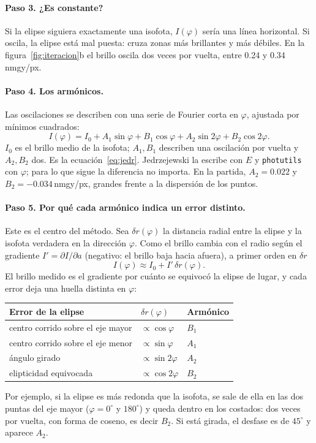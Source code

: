 \documentclass[11pt,a4paper]{article}
\newcommand{\code}[1]{\texttt{#1}}
\begin{document}
\paragraph{Paso 3. ¿Es constante?} Si la elipse siguiera exactamente una isofota, $I(\varphi)$ sería una línea
horizontal. Si oscila, la elipse está mal puesta: cruza zonas más brillantes y más débiles. En la
figura~\ref{fig:iteracion}b el brillo oscila dos veces por vuelta, entre 0.24 y 0.34\,nmgy/px.

\paragraph{Paso 4. Los armónicos.} Las oscilaciones se describen con una serie de Fourier corta en $\varphi$,
ajustada por mínimos cuadrados:
\begin{equation}\label{eq:armonicos}
I(\varphi) = I_0 + A_1\sin\varphi + B_1\cos\varphi + A_2\sin 2\varphi + B_2\cos 2\varphi .
\end{equation}
$I_0$ es el brillo medio de la isofota; $A_1, B_1$ describen una oscilación por vuelta y $A_2, B_2$ dos. Es la
ecuación~\eqref{eq:jedr}. Jedrzejewski la escribe con $E$ y \code{photutils} con $\varphi$; para lo que sigue
la diferencia no importa. En la partida,
$A_2 = 0.022$ y $B_2 = -0.034$\,nmgy/px, grandes frente a la dispersión de los puntos.

\paragraph{Paso 5. Por qué cada armónico indica un error distinto.} Este es el centro del método. Sea
$\delta r(\varphi)$ la distancia radial entre la elipse y la isofota verdadera en la dirección $\varphi$. Como el
brillo cambia con el radio según el gradiente $I' = \partial I/\partial a$ (negativo: el brillo baja hacia
afuera), a primer orden en $\delta r$
\begin{equation}\label{eq:taylor}
I(\varphi) \approx I_0 + I'\,\delta r(\varphi) .
\end{equation}
El brillo medido es el gradiente por cuánto se equivocó la elipse de lugar, y cada error deja una huella
distinta en $\varphi$:
\begin{center}
\begin{tabular}{lll}
\toprule
Error de la elipse & $\delta r(\varphi)$ & Armónico \\
\midrule
centro corrido sobre el eje mayor & $\propto\cos\varphi$ & $B_1$ \\
centro corrido sobre el eje menor & $\propto\sin\varphi$ & $A_1$ \\
ángulo girado & $\propto\sin 2\varphi$ & $A_2$ \\
elipticidad equivocada & $\propto\cos 2\varphi$ & $B_2$ \\
\bottomrule
\end{tabular}
\end{center}
Por ejemplo, si la elipse es más redonda que la isofota, se sale de ella en las dos puntas del eje mayor
($\varphi = 0^\circ$ y $180^\circ$) y queda dentro en los costados: dos veces por vuelta, con forma de coseno,
es decir $B_2$. Si está girada, el desfase es de $45^\circ$ y aparece $A_2$.
\end{document}
